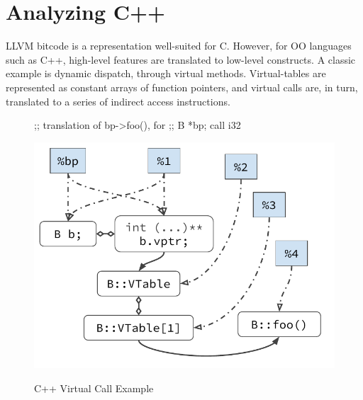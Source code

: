 \section{Analyzing C++}
\label{structsens/sect/cxx}

LLVM bitcode is a representation well-suited for C. However, for OO
languages such as C++, high-level features are
translated to low-level constructs.  A classic example is dynamic
dispatch, through virtual methods. Virtual-tables are represented as
constant arrays of function pointers, and virtual calls are, in turn,
translated to a series of indirect access instructions.

\begin{figure}[ht]
  \begin{minipage}[b]{.5\linewidth}
%

\begin{bitcode}

;; translation of bp->foo(), for
;; B *bp;
call i32 %
\end{bitcode}
    \label{structsens/fig/vcall:bitcode}
  \end{minipage}
  \begin{minipage}[b]{.5\linewidth}
    \centering
    \includegraphics[trim={0 0 0 0},clip,width=1\linewidth]{figures/structsens/Virtual-Call.pdf}
    \label{structsens/fig/vcall:ptgraph}
  \end{minipage}
  \caption{C++ Virtual Call Example}
  \label{structsens/fig/vcall}
\end{figure}

